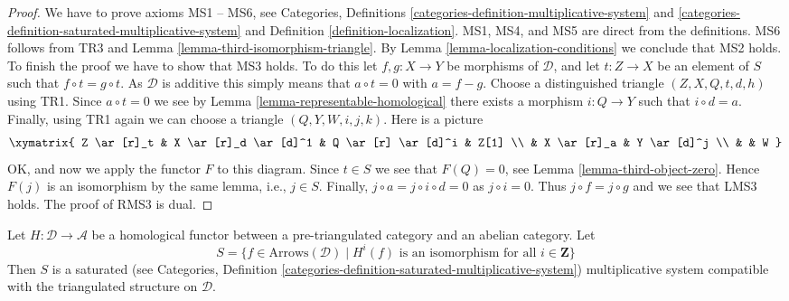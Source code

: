 \begin{proof}
We have to prove axioms MS1 -- MS6, see
Categories, Definitions \ref{categories-definition-multiplicative-system} and
\ref{categories-definition-saturated-multiplicative-system}
and
Definition \ref{definition-localization}.
MS1, MS4, and MS5 are direct from the definitions. MS6 follows from TR3 and
Lemma \ref{lemma-third-isomorphism-triangle}.
By
Lemma \ref{lemma-localization-conditions}
we conclude that MS2 holds. To finish the proof we have to show that
MS3 holds. To do this let $f, g : X \to Y$ be morphisms of $\mathcal{D}$,
and let $t : Z \to X$ be an element of $S$ such that $f \circ t = g \circ t$.
As $\mathcal{D}$ is additive this simply means that $a \circ t = 0$ with
$a = f - g$. Choose a distinguished triangle $(Z, X, Q, t, d, h)$ using TR1.
Since $a \circ t = 0$ we see by
Lemma \ref{lemma-representable-homological}
there exists a morphism $i : Q \to Y$ such that $i \circ d = a$.
Finally, using TR1 again we can choose a triangle
$(Q, Y, W, i, j, k)$. Here is a picture
$$
\xymatrix{
Z \ar[r]_t & X \ar[r]_d \ar[d]^1 & Q \ar[r] \ar[d]^i & Z[1] \\
& X \ar[r]_a & Y \ar[d]^j \\
& & W
}
$$
OK, and now we apply the functor $F$ to this diagram.
Since $t \in S$ we see that $F(Q) = 0$, see
Lemma \ref{lemma-third-object-zero}.
Hence $F(j)$ is an isomorphism by the same lemma, i.e., $j \in S$.
Finally, $j \circ a = j \circ i \circ d = 0$ as $j \circ i = 0$.
Thus $j \circ f = j \circ g$ and we see that LMS3 holds.
The proof of RMS3 is dual.
\end{proof}

\begin{lemma}
\label{lemma-homological-functor-localize}
Let $H : \mathcal{D} \to \mathcal{A}$ be a homological functor between a
pre-triangulated category and an abelian category. Let
$$
S = \{f \in \text{Arrows}(\mathcal{D})
\mid H^i(f)\text{ is an isomorphism for all }i \in \mathbf{Z}\}
$$
Then $S$ is a saturated (see
Categories,
Definition \ref{categories-definition-saturated-multiplicative-system})
multiplicative system compatible with the
triangulated structure on $\mathcal{D}$.
\end{lemma}

